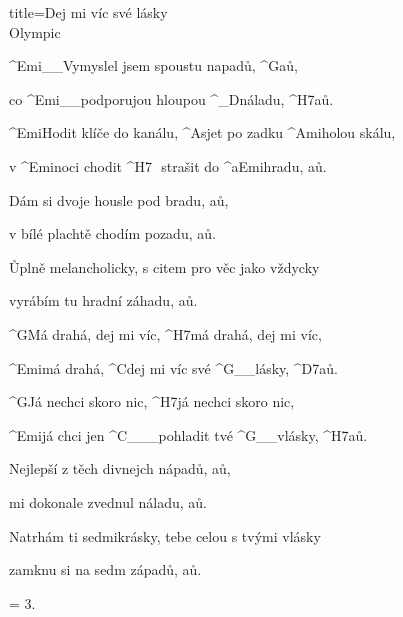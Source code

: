 \begin{song}{title=\predtitle\centering Dej mi víc své lásky \\\large Olympic  \vspace*{-0.3cm}}  %
\begin{centerjustified}
\nejnejvetsi

\sloka
	^{Emi{\color{white}\_\_}}Vymyslel jsem spoustu napadů, ^{G}aů,
   
	co ^{Emi{\color{white}\_\_}}podporujou hloupou ^{{\color{white}\_}D}náladu, ^{H7}aů.

	^{Emi}Hodit klíče do kanálu, ^{A}sjet po zadku ^{Ami}holou skálu,

	v ^{Emi}noci chodit ^{H7\,\,\,\,}strašit do ^{{\color{white}a}Emi}hradu, aů.

\sloka
	Dám si dvoje housle pod bradu, aů,

	v bílé plachtě chodím pozadu, aů.
	
	Ůplně melancholicky, s citem pro věc jako vždycky

	vyrábím tu hradní záhadu, aů.

	^{G}Má drahá, dej mi víc, ^{H7}má drahá, dej mi víc,

	^{Emi}má drahá, ^{C}dej mi víc své ^{G{\color{white}\_\_}}lásky, ^{D7}aů.

	^{G}Já nechci skoro nic, ^{H7}já nechci skoro nic,

	^{Emi}já chci jen ^{C{\color{white}\_\_\_}}pohladit tvé ^{G{\color{white}\_\_}}vlásky, ^{H7}aů.

\sloka
	Nejlepší z těch divnejch nápadů, aů,
	
	mi dokonale zvednul náladu, aů.

	Natrhám ti sedmikrásky, tebe celou s tvými vlásky

	zamknu si na sedm západů, aů.


\sloka = 3.

\end{centerjustified}
\setcounter{Slokočet}{0}
\end{song}
